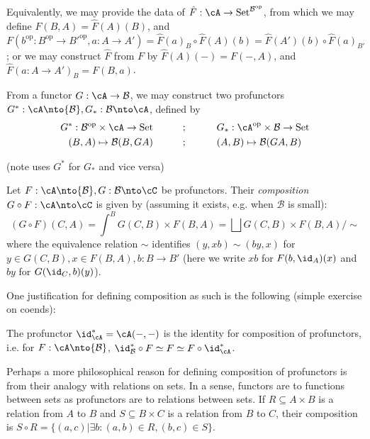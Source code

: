 \documentclass[12pt]{article}
\newcommand{\op}{{\text{op}}}
\newcommand{\cB}{{\mathcal{B}}}
\DeclareMathOperator{\Set}{Set}
\begin{document}
\begin{remark}
\label{r:profunctor-alt}
Equivalently, we may provide the data of
$\hat{F} : \cA \to \Set^{\cB^\op}$,
from which we may define $F(B,A) = \hat{F}(A)(B)$,
and $F(b^\op: B^\op \to B'^\op,a: A \to A')
= \hat{F}(a)_B \circ \hat{F}(A)(b)
= \hat{F}(A')(b) \circ \hat{F}(a)_{B'}$;
or we may construct $\hat{F}$ from $F$ by
$\hat{F}(A)(-) = F(-,A)$,
and $\hat{F}(a:A \to A')_B = F(B,a)$.
\end{remark}

\begin{example}
From a functor $G: \cA \to \cB$,
we may construct two profunctors
$G^*: \cA \nto \cB, G_*: \cB \nto \cA$,
defined by
\begin{align*}
G^* : \cB^\op \times \cA \to \Set
\hspace{30pt}
&;
\hspace{30pt}
G_* : \cA^\op \times \cB \to \Set
\\
(B, A) \mapsto \cB(B, GA)
\hspace{30pt}
&;
\hspace{30pt}
(A, B) \mapsto \cB(GA, B)
\end{align*}

(note \cite{Lawvere} uses $G^*$ for $G_*$ and
vice versa)
\end{example}

\begin{definition}
Let $F: \cA \nto \cB, G: \cB \nto \cC$
be profunctors.
Their \emph{composition}
$G \circ F: \cA \nto \cC$
is given by
(assuming it exists, e.g. when $\cB$ is small):
\[
(G \circ F)(C,A) =
\int^B G(C,B) \times F(B,A)
=
\bigsqcup G(C,B) \times F(B,A) / \sim
\]
where the equivalence relation $\sim$
identifies $(y, xb) \sim (by,x)$
for $y \in G(C,B), x \in F(B,A), b: B \to B'$
(here we write $xb$ for $F(b,\id_A)(x)$
and $by$ for $G(\id_C,b)(y)$).
\end{definition}

One justification for defining composition as such is
the following (simple exercise on coends):
\begin{lemma}
The profunctor $\id_\cA^* = \cA(-,-)$ is
the identity for composition of profunctors,
i.e. for $F: \cA \nto \cB$,
$\id_\cB^* \circ F \simeq F \simeq F \circ \id_\cA^*$.
\end{lemma}

Perhaps a more philosophical reason for defining
composition of profunctors is from
their analogy with relations on sets.
In a sense, functors are to functions between sets
as profunctors are to relations between sets.
If $R \subseteq A \times B$ is a relation from $A$ to $B$
and $S \subseteq B \times C$ is a relation from $B$ to $C$,
their composition is
$S \circ R = \{(a,c) | \exists b: (a,b) \in R, (b,c) \in S\}$.
\end{document}
